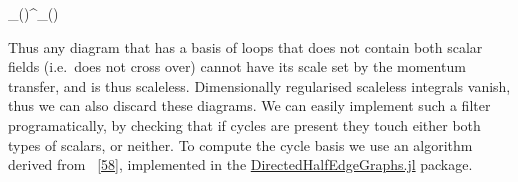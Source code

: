 \documentclass[
  11pt,
  a4paper,
  DIV=11,
  numbers=noendperiod,
  twoside]{scrreprt}
\let\[\relax \let\]\relax %
\DeclareRobustCommand{\[}{\begin{equation}}
\DeclareRobustCommand{\]}{\end{equation}}
\begin{document}
\[
_()\lambda^\eta {}_()
\]

Thus any diagram that has a basis of loops that does not contain both
scalar fields (i.e.~does not cross over) cannot have its scale set by
the momentum transfer, and is thus scaleless. Dimensionally regularised
scaleless integrals vanish, thus we can also discard these diagrams. We
can easily implement such a filter programatically, by checking that if
cycles are present they touch either both types of scalars, or neither.
To compute the cycle basis we use an algorithm derived from
~{[}\protect\hyperlink{ref-Paton:1969}{58}{]}, implemented in the
\href{https://github.com/lcnhb/DirectedHalfEdgeGraphs.jl}{DirectedHalfEdgeGraphs.jl}
package.
\end{document}
